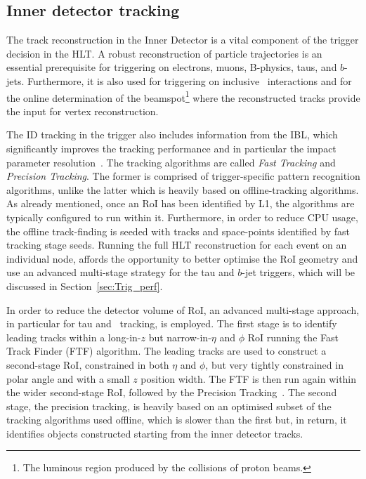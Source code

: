 		
		\subsection{Inner detector tracking}
		\label{sec:tracking}

			The track reconstruction in the Inner Detector is a vital component of the trigger decision in the HLT. A robust reconstruction of particle trajectories is an essential prerequisite for triggering on electrons, muons, B-physics, taus, and $b$-jets. Furthermore, it is also used for triggering on inclusive \pp\ interactions and for the online determination of the beamspot\footnote{The luminous region produced by the collisions of proton beams.} where the reconstructed tracks provide the input for vertex reconstruction.

			The ID tracking in the trigger also includes information from the IBL, which significantly improves the tracking performance and in particular the impact parameter resolution~\cite{IBLTDR}. The tracking algorithms are called \emph{Fast Tracking} and \emph{Precision Tracking}. The former is comprised of trigger-specific pattern recognition algorithms, unlike the latter which is heavily based on offline-tracking algorithms.
			As already mentioned, once an RoI has been identified by L1, the algorithms are typically configured to run within it. Furthermore, in order to reduce CPU usage, the offline track-finding is seeded with tracks and space-points identified by fast tracking stage seeds. Running the full HLT reconstruction for each event on an individual node, affords the opportunity to better optimise the RoI geometry and use an advanced multi-stage strategy for the tau and $b$-jet triggers, which will be discussed in Section~\ref{sec:Trig_perf}. 

			In order to reduce the detector volume of RoI, an advanced multi-stage approach, in particular for tau and \bj\ tracking, is employed. The first stage is to identify leading tracks within a long-in-$z$ but narrow-in-$\eta$ and $\phi$ RoI running the Fast Track Finder (FTF) algorithm. The leading tracks are used to construct a second-stage RoI, constrained in both $\eta$ and $\phi$, but very tightly constrained in polar angle and with a small $z$ position width. The FTF is then run again within the wider second-stage RoI, followed by the Precision Tracking~\cite{Miano:2016oty}. The second stage, the precision tracking, is heavily based on an optimised subset of the tracking algorithms used offline, which is slower than the first but, in return, it identifies objects constructed starting from the inner detector tracks.

